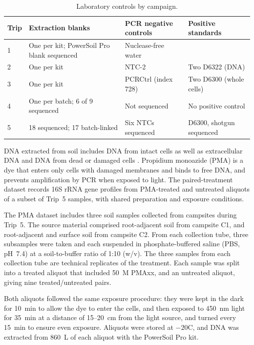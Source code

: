 \begin{revision}
\begin{table}[h]
\centering
\caption{Laboratory controls by campaign.}
\label{tab:controls}
\small
\setlength{\tabcolsep}{4pt}
\begin{tabular}{p{}p{}p{}p{}}
\toprule
Trip & Extraction blanks & PCR negative controls & Positive standards \\
\midrule
1 & One per kit; PowerSoil Pro blank sequenced & Nuclease-free water \\
2 & One per kit & NTC-2 & Two D6322 (DNA) \\
3 & One per kit & PCRCtrl (index 728) & Two D6300 (whole cells) \\
4 & One per batch; 6 of 9 sequenced & Not sequenced & No positive control \\
5 & 18 sequenced; 17 batch-linked & Six NTCs sequenced & D6300, shotgun sequenced \\
\bottomrule
\end{tabular}
\end{table}


DNA extracted from soil includes DNA from intact cells as well as extracellular DNA and DNA from dead or damaged cells \cite{carini2016relic}. Propidium monoazide (PMA) is a dye that enters only cells with damaged membranes and binds to free DNA, and prevents amplification by PCR when exposed to light. The paired-treatment dataset records 16S rRNA gene profiles from PMA-treated and untreated aliquots of a subset of Trip~5 samples, with shared preparation and exposure conditions.

The PMA dataset includes three soil samples collected from campsites during Trip~5. The source material comprised root-adjacent soil from campsite C1, and root-adjacent and surface soil from campsite C2. From each collection tube, three subsamples were taken and each suspended in phosphate-buffered saline (PBS, pH~7.4) at a soil-to-buffer ratio of 1:10 (w/v). The three samples from each collection tube are technical replicates of the treatment. Each sample was split into a treated aliquot that included 50~\textmu M PMAxx, and an untreated aliquot, giving nine treated/untreated pairs.

Both aliquots followed the same exposure procedure: they were kept in the dark for 10~min to allow the dye to enter the cells, and then exposed to 450~nm light for 35~min at a distance of 15--20~cm from the light source, and turned every 15~min to ensure even exposure. Aliquots were stored at $-20$\degree C, and DNA was extracted from 860~\textmu L of each aliquot with the PowerSoil Pro kit.



\end{revision}
